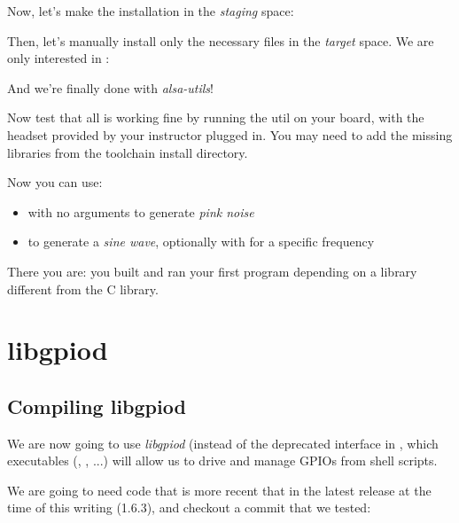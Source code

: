 Now, let's make the installation in the {\em staging} space:


Then, let's manually install only the necessary files in the {\em target}
space. We are only interested in :


And we're finally done with {\em alsa-utils}!

Now test that all is working fine by running the  util on
your board, with the headset provided by your instructor plugged
in. You may need to add the missing libraries from the toolchain
install directory.

Now you can use:

\begin{itemize}

\item {} with no arguments to generate {\em pink noise}

\item {} to generate a {\em sine wave},
optionally with  for a specific frequency

\end{itemize}

There you are: you built and ran your first program depending
on a library different from the C library.

\section{libgpiod}

\subsection{Compiling libgpiod}

We are now going to use {\em libgpiod} (instead of the
deprecated interface in , which executables
(, , ...) will
allow us to drive and manage GPIOs from shell scripts.

We are going to need code that is more recent that in the
latest release at the time of this writing (1.6.3), and
checkout a commit that we tested:

